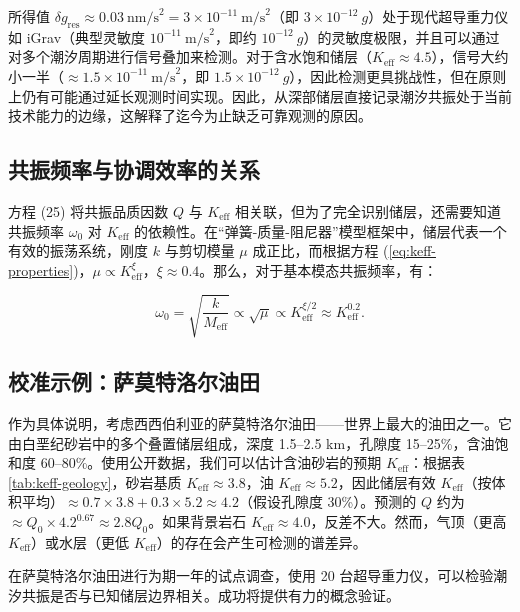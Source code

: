 \documentclass[12pt,a4paper]{article}
\theoremstyle{remark}
\newcommand{\Keff}{K_{\mathrm{eff}}}
\begin{document}
	所得值 \(\delta g_{\text{res}} \approx 0.03\ \text{nm/s}^2 = 3 \times 10^{-11}\ \text{m/s}^2\)（即 \(3 \times 10^{-12}\ g\)）处于现代超导重力仪如 iGrav（典型灵敏度 \(10^{-11}\ \text{m/s}^2\)，即约 \(10^{-12}\ g\)）的灵敏度极限，并且可以通过对多个潮汐周期进行信号叠加来检测。对于含水饱和储层（\(\Keff \approx 4.5\)），信号大约小一半（\(\approx 1.5\times10^{-11}\ \text{m/s}^2\)，即 \(1.5\times10^{-12}\ g\)），因此检测更具挑战性，但在原则上仍有可能通过延长观测时间实现。因此，从深部储层直接记录潮汐共振处于当前技术能力的边缘，这解释了迄今为止缺乏可靠观测的原因。
	
	\subsection{共振频率与协调效率的关系}
	\label{subsec:frequency_keff}
	
	方程 (25) 将共振品质因数 \(Q\) 与 \(\Keff\) 相关联，但为了完全识别储层，还需要知道共振频率 \(\omega_0\) 对 \(\Keff\) 的依赖性。在“弹簧-质量-阻尼器”模型框架中，储层代表一个有效的振荡系统，刚度 \(k\) 与剪切模量 \(\mu\) 成正比，而根据方程 (\ref{eq:keff-properties})，\(\mu \propto \Keff^{\xi}\)，\(\xi \approx 0.4\)。那么，对于基本模态共振频率，有：
	
	\begin{equation}
		\omega_0 = \sqrt{\frac{k}{M_{\text{eff}}}} \propto \sqrt{\mu} \propto \Keff^{\xi/2} \approx \Keff^{0.2}.
		\label{eq:omega_keff}
	\end{equation}
	
	\subsection{校准示例：萨莫特洛尔油田}
	
	作为具体说明，考虑西西伯利亚的萨莫特洛尔油田——世界上最大的油田之一。它由白垩纪砂岩中的多个叠置储层组成，深度 1.5–2.5 km，孔隙度 15–25\%，含油饱和度 60–80\%。使用公开数据，我们可以估计含油砂岩的预期 $\Keff$：根据表 \ref{tab:keff-geology}，砂岩基质 $\Keff \approx 3.8$，油 $\Keff \approx 5.2$，因此储层有效 $\Keff$（按体积平均）\(\approx 0.7 \times 3.8 + 0.3 \times 5.2 \approx 4.2\)（假设孔隙度 30\%）。预测的 $Q$ 约为 $\approx Q_0 \times 4.2^{0.67} \approx 2.8 Q_0$。如果背景岩石 $\Keff \approx 4.0$，反差不大。然而，气顶（更高 $\Keff$）或水层（更低 $\Keff$）的存在会产生可检测的谱差异。
	
	在萨莫特洛尔油田进行为期一年的试点调查，使用 20 台超导重力仪，可以检验潮汐共振是否与已知储层边界相关。成功将提供有力的概念验证。
	
\end{document}
